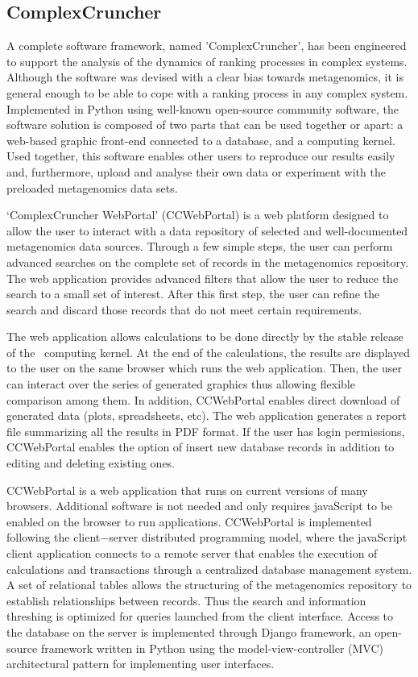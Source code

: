 \subsection*{ComplexCruncher}

A complete software framework, named 'ComplexCruncher', has been engineered to support the analysis of the dynamics of ranking processes in complex systems. Although the software was devised with a clear bias towards metagenomics, it is general enough to be able to cope with a ranking process in any complex system. Implemented in Python using well-known open-source community software, the software solution is composed of two parts that can be used together or apart: a web-based graphic front-end connected to a database, and a computing kernel. Used together, this software enables other users to reproduce our results easily and, furthermore, upload and analyse their own data or experiment with the preloaded metagenomics data sets.

`ComplexCruncher WebPortal' (CCWebPortal) is a web platform designed to allow the user to interact with a data repository of selected and well-documented metagenomics data sources. Through a few simple steps, the user can perform advanced searches on the complete set of records in the metagenomics repository.  The web application provides advanced filters that allow the user to reduce the search to a small set of interest. After this first step, the user can refine the search and discard those records that do not meet certain requirements.

The web application allows calculations to be done directly by the stable release of the \CC\ computing kernel. At the end of the calculations, the results are displayed to the user on the same browser which runs the web application. Then, the user can interact over the series of generated graphics thus allowing flexible comparison among them. In addition, CCWebPortal enables direct download of generated data (plots, spreadsheets, etc). The web application generates a report file summarizing all the results in PDF format. If the user has login permissions, CCWebPortal enables the option of insert new database records in addition to editing and deleting existing ones.

CCWebPortal is a web application that runs on current versions of many browsers. Additional software is not needed and only requires javaScript to be enabled on the browser to run applications. 
CCWebPortal is implemented following the client$-$server distributed programming model, where the javaScript client application connects to a remote server that enables the execution of calculations and transactions through a centralized database management system. A set of relational tables allows the structuring of the metagenomics repository to establish relationships between records. Thus the search and information threshing is optimized for queries launched from the client interface. Access to the database on the server is implemented through Django framework, an open-source framework written in Python using the model-view-controller (MVC) architectural pattern for implementing user interfaces.


